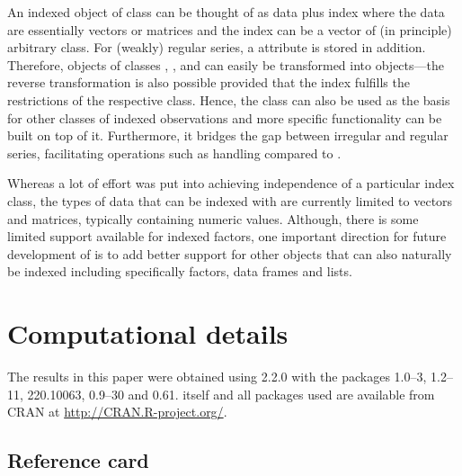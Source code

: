 \documentclass{Z}
\begin{document}
An indexed object of class  can be thought of as data plus index
where the data are essentially vectors or matrices and the index can be
a vector of (in principle) arbitrary class. For (weakly) regular 
series, a  attribute is stored in addition. Therefore, objects of classes
, ,  and  can easily
be transformed into  objects---the reverse transformation is also possible 
provided that the index fulfills the restrictions of the respective class.
Hence, the  class can also be used as the basis for other
classes of indexed observations and more specific functionality can be built on
top of it. Furthermore, it bridges the gap between irregular and regular series,
facilitating operations such as  handling compared to .

Whereas a lot of effort was put into achieving independence of a particular
index class, the types of data that can be indexed with  are currently
limited to vectors and matrices, typically containing numeric values. Although,
there is some limited support available for indexed factors, one important 
direction for future development of  is to add better support for other
objects that can also naturally be indexed including specifically factors, data
frames and lists.



\section*{Computational details}

The results in this paper were obtained using 
2.2.0 with the packages
 1.0--3,
 1.2--11,
 220.10063,
 0.9--30 and
 0.61.
 itself and all packages used are available from
CRAN at \url{http://CRAN.R-project.org/}.




\newpage

\begin{appendix}
\section{Reference card}

\end{appendix}
\end{document}
